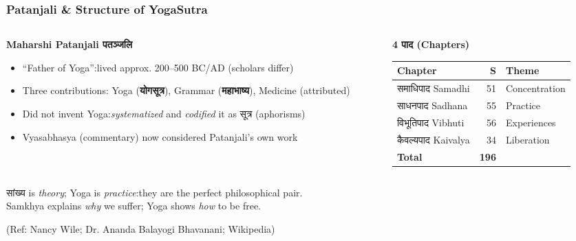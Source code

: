 \begin{frame}[fragile]\frametitle{Patanjali \& Structure of YogaSutra}

\begin{columns}
\begin{column}[t]{0.45\linewidth}
\textbf{Maharshi Patanjali पतञ्जलि}
\begin{itemize}
\item ``Father of Yoga'':lived approx. 200–500 BC/AD (scholars differ)
\item Three contributions: Yoga (\textbf{योगसूत्र}), Grammar (\textbf{महाभाष्य}), Medicine (attributed)
\item Did not invent Yoga:\emph{systematized} and \emph{codified} it as सूत्र (aphorisms)
\item Vyasabhasya (commentary) now considered Patanjali's own work
\end{itemize}
\end{column}
\begin{column}[t]{0.55\linewidth}
\textbf{4 पाद (Chapters)}
\begin{center}
{\small
\begin{tabular}{|p{3cm}|r|p{3cm}|}
\hline
\textbf{Chapter} & \textbf{S} & \textbf{Theme} \\
\hline
समाधिपाद Samadhi & 51 & Concentration \\
साधनपाद Sadhana & 55 & Practice \\
विभूतिपाद Vibhuti & 56 & Experiences \\
कैवल्यपाद Kaivalya & 34 & Liberation \\
\hline
\textbf{Total} & \textbf{196} & \\
\hline
\end{tabular}
}
\end{center}
\end{column}
\end{columns}

\vspace{2mm}
\begin{center}
सांख्य is \emph{theory}; Yoga is \emph{practice}:they are the perfect philosophical pair.\\
{\small Samkhya explains \emph{why} we suffer; Yoga shows \emph{how} to be free.}
\end{center}

\tiny{(Ref: Nancy Wile; Dr. Ananda Balayogi Bhavanani; Wikipedia)}

\end{frame}

